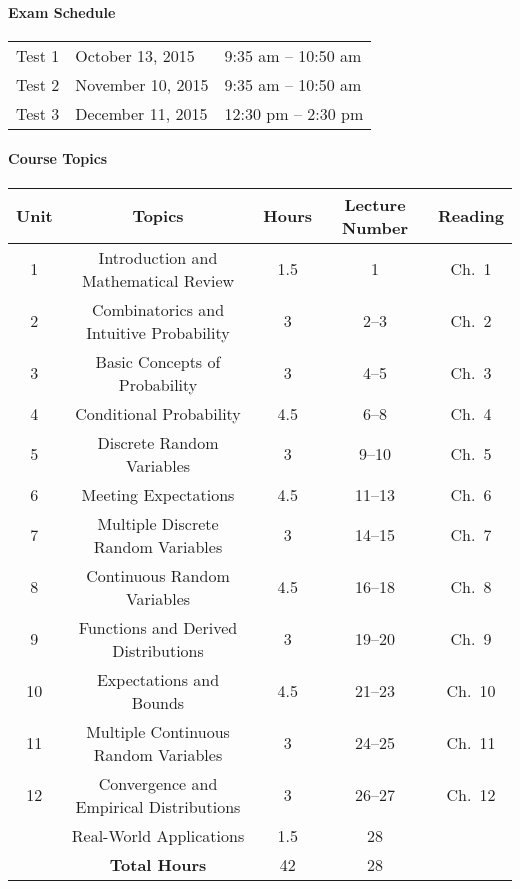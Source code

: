 \documentclass{article}
\begin{document}
\paragraph*{Exam Schedule}
\begin{center}
\begin{tabular}{lll}
Test 1 & October 13, 2015 & 9:35 am -- 10:50 am \tabularnewline
Test 2 & November 10, 2015 & 9:35 am -- 10:50 am \tabularnewline
Test 3 & December 11, 2015 & 12:30 pm -- 2:30 pm
\end{tabular}
\end{center}


\paragraph*{Course Topics}
\begin{center}
\begin{tabular}{|c|c|c|c|c|}
\hline
Unit & Topics & Hours & Lecture Number & Reading \tabularnewline
\hline
1 & Introduction and Mathematical Review & 1.5 & 1 & Ch.~1 \tabularnewline
\hline
2 & Combinatorics and Intuitive Probability & 3 & 2--3 & Ch.~2 \tabularnewline
\hline
3 & Basic Concepts of Probability & 3 & 4--5 & Ch.~3 \tabularnewline
\hline
4 & Conditional Probability & 4.5 & 6--8 & Ch.~4 \tabularnewline
\hline
5 & Discrete Random Variables & 3 & 9--10 & Ch.~5 \tabularnewline
\hline
6 & Meeting Expectations & 4.5 & 11--13 & Ch.~6 \tabularnewline
\hline
7 & Multiple Discrete Random Variables & 3 & 14--15 & Ch.~7 \tabularnewline
\hline
8 & Continuous Random Variables & 4.5 & 16--18 & Ch.~8 \tabularnewline
\hline
9 & Functions and Derived Distributions & 3 & 19--20 & Ch.~9 \tabularnewline
\hline
10 & Expectations and Bounds & 4.5 & 21--23 & Ch.~10 \tabularnewline
\hline
11 & Multiple Continuous Random Variables & 3 & 24--25 & Ch.~11 \tabularnewline
\hline
12 & Convergence and Empirical Distributions & 3 & 26--27 & Ch.~12 \tabularnewline
\hline
& Real-World Applications & 1.5 & 28 & \tabularnewline
\hline
 & \textbf{Total Hours} & 42 & 28 & \tabularnewline
\hline
\end{tabular}
\par\end{center}
\end{document}

